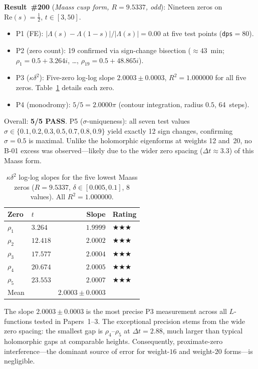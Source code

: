 \documentclass[11pt, a4paper]{article}
\theoremstyle{plain}
\theoremstyle{definition}
\begin{document}
\medskip
\noindent\textbf{Result~\#200} (\textit{Maass cusp form, $R=9.5337$, odd}):
Nineteen zeros on $\mathrm{Re}(s)=\tfrac{1}{2}$, $t\in[3,50]$.

\begin{itemize}
  \item P1 (FE): $|\Lambda(s)-\Lambda(1-s)|/|\Lambda(s)|=0.00$ at five test
        points (\texttt{dps}$=80$).
  \item P2 (zero count): 19 confirmed via sign-change bisection
        ($\approx 43$~min; $\rho_1=0.5+3.264i$, \ldots, $\rho_{19}=0.5+48.865i$).
  \item P3 ($\kappa\delta^{2}$): Five-zero log-log slope
        $\mathbf{2.0003\pm 0.0003}$, $R^{2}=1.000000$ for all five zeros.
        Table~\ref{tab:maass_kd2} details each zero.
  \item P4 (monodromy): $5/5=2.0000\pi$ (contour integration, radius $0.5$,
        64~steps).
\end{itemize}
Overall: \textbf{5/5 PASS}.  P5 ($\sigma$-uniqueness): all seven test values
$\sigma\in\{0.1,0.2,0.3,0.5,0.7,0.8,0.9\}$ yield exactly 12 sign changes,
confirming $\sigma=0.5$ is maximal.  Unlike the holomorphic eigenforms at
weights 12 and~20, no B-01 excess was observed---likely due to the wider
zero spacing ($\Delta t\approx 3.3$) of this Maass form.

\begin{table}[ht]
\centering
\caption{$\kappa\delta^{2}$ log-log slopes for the five lowest Maass zeros
  ($R=9.5337$, $\delta\in[0.005,0.1]$, 8 values).  All $R^{2}=1.000000$.}
\label{tab:maass_kd2}
\small
\begin{tabular}{llrl}
\toprule
Zero & $t$ & Slope & Rating \\
\midrule
$\rho_1$ & $3.264$ & $1.9999$ & $\bigstar\bigstar\bigstar$ \\
$\rho_2$ & $12.418$ & $2.0002$ & $\bigstar\bigstar\bigstar$ \\
$\rho_3$ & $17.577$ & $2.0004$ & $\bigstar\bigstar\bigstar$ \\
$\rho_4$ & $20.674$ & $2.0005$ & $\bigstar\bigstar\bigstar$ \\
$\rho_5$ & $23.553$ & $2.0007$ & $\bigstar\bigstar\bigstar$ \\
\midrule
Mean & & $2.0003\pm 0.0003$ & \\
\bottomrule
\end{tabular}
\end{table}

The slope $2.0003\pm 0.0003$ is the most precise P3 measurement across
all $L$-functions tested in Papers~1--3.  The exceptional precision stems
from the wide zero spacing: the smallest gap is $\rho_4$--$\rho_5$ at
$\Delta t=2.88$, much larger than typical holomorphic gaps at comparable
heights.  Consequently, proximate-zero interference---the dominant source
of error for weight-$16$ and weight-$20$ forms---is negligible.
\end{document}
